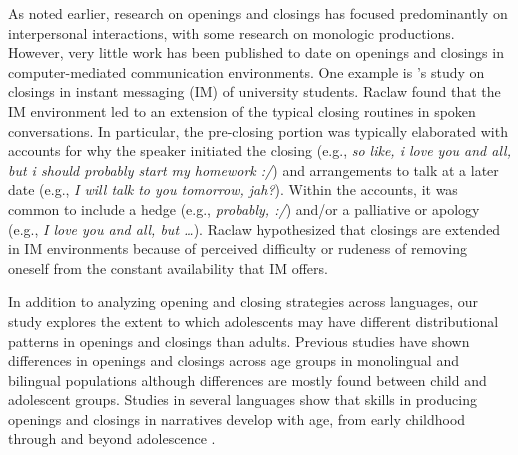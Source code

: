 \documentclass[output=paper,colorlinks,citecolor=brown]{langscibook}
\begin{document}
 As noted earlier, research on openings and closings has focused predominantly on interpersonal interactions, with some research on monologic productions. However, very little work has been published to date on openings and closings in computer-mediated communication environments. One example is \textcite{raclaw_two_2008}'s study on closings in instant messaging (IM) of university students. Raclaw found that the IM environment led to an extension of the typical closing routines in spoken conversations. In particular, the pre-closing portion was typically elaborated with accounts for why the speaker initiated the closing (e.g., \textit{so like, i love you and all, but i should probably start my homework :/}) and arrangements to talk at a later date (e.g., \textit{I will talk to you tomorrow, jah?}). Within the accounts, it was common to include a hedge (e.g., \textit{probably, :/}) and/or a palliative or apology (e.g., \textit{I love you and all, but …}). Raclaw hypothesized that closings are extended in IM environments because of perceived difficulty or rudeness of removing oneself from the constant availability that IM offers.

 In addition to analyzing opening and closing strategies across languages, our study explores the extent to which adolescents may have different distributional patterns in openings and closings than adults. Previous studies have shown differences in openings and closings across age groups in monolingual and bilingual populations \parencite[e.g.][] {tolchinsky_text_2002,dollnick_entwicklung_2013} although differences are mostly found between child and adolescent groups. Studies in several languages show that skills in producing openings and closings in narratives develop with age, from early childhood through and beyond adolescence \parencite{berman_cross-linguistic_2002,berman_form_2004,dollnick_entwicklung_2013,ravid_developing_2002,tolchinsky_text_2002}. 
 
\end{document}
